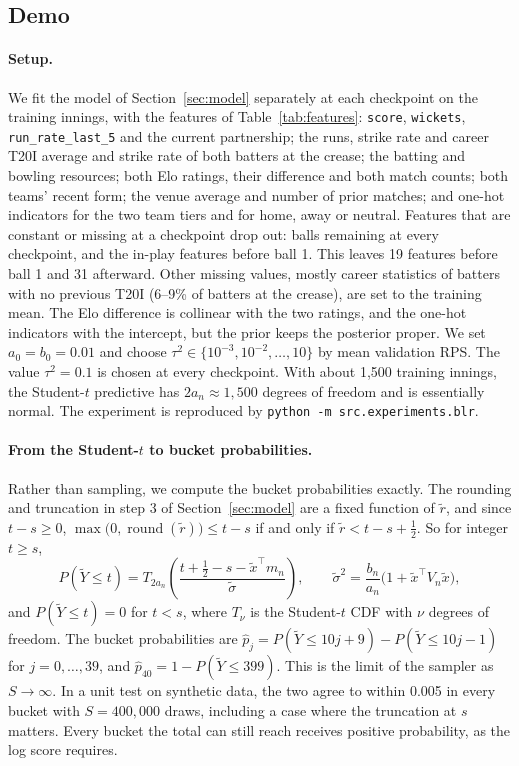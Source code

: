 \documentclass{article}
\newcommand{\1}{\mathbf{1}}
\begin{document}
\subsection{Demo}\label{sec:demo}
\paragraph{Setup.} We fit the model of Section~\ref{sec:model} separately at each checkpoint on the training innings, with the features of Table~\ref{tab:features}: \texttt{score}, \texttt{wickets}, \texttt{run\_rate\_last\_5} and the current partnership; the runs, strike rate and career T20I average and strike rate of both batters at the crease; the batting and bowling resources; both Elo ratings, their difference and both match counts; both teams' recent form; the venue average and number of prior matches; and one-hot indicators for the two team tiers and for home, away or neutral. Features that are constant or missing at a checkpoint drop out: balls remaining at every checkpoint, and the in-play features before ball 1. This leaves 19 features before ball 1 and 31 afterward. Other missing values, mostly career statistics of batters with no previous T20I (6--9\% of batters at the crease), are set to the training mean. The Elo difference is collinear with the two ratings, and the one-hot indicators with the intercept, but the prior keeps the posterior proper. We set $a_0 = b_0 = 0.01$ and choose $\tau^2 \in \{10^{-3}, 10^{-2}, \dots, 10\}$ by mean validation RPS. The value $\tau^2 = 0.1$ is chosen at every checkpoint. With about 1{,}500 training innings, the Student-$t$ predictive has $2a_n \approx 1{,}500$ degrees of freedom and is essentially normal. The experiment is reproduced by \texttt{python -m src.experiments.blr}.

\paragraph{From the Student-$t$ to bucket probabilities.} Rather than sampling, we compute the bucket probabilities exactly. The rounding and truncation in step 3 of Section~\ref{sec:model} are a fixed function of $\tilde r$, and since $t - s \ge 0$, $\max\big(0, \operatorname{round}(\tilde r)\big) \le t - s$ if and only if $\tilde r < t - s + \tfrac12$. So for integer $t \ge s$,
\begin{equation}\label{eq:tcdf}
P(\tilde Y \le t) = T_{2a_n}\!\left(\frac{t + \tfrac12 - s - \tilde x^\top m_n}{\tilde\sigma}\right), \qquad \tilde\sigma^2 = \frac{b_n}{a_n}\big(1 + \tilde x^\top V_n \tilde x\big),
\end{equation}
and $P(\tilde Y \le t) = 0$ for $t < s$, where $T_\nu$ is the Student-$t$ CDF with $\nu$ degrees of freedom. The bucket probabilities are $\hat p_j = P(\tilde Y \le 10j + 9) - P(\tilde Y \le 10j - 1)$ for $j = 0, \dots, 39$, and $\hat p_{40} = 1 - P(\tilde Y \le 399)$. This is the limit of the sampler as $S \to \infty$. In a unit test on synthetic data, the two agree to within 0.005 in every bucket with $S = 400{,}000$ draws, including a case where the truncation at $s$ matters. Every bucket the total can still reach receives positive probability, as the log score requires.
\end{document}
